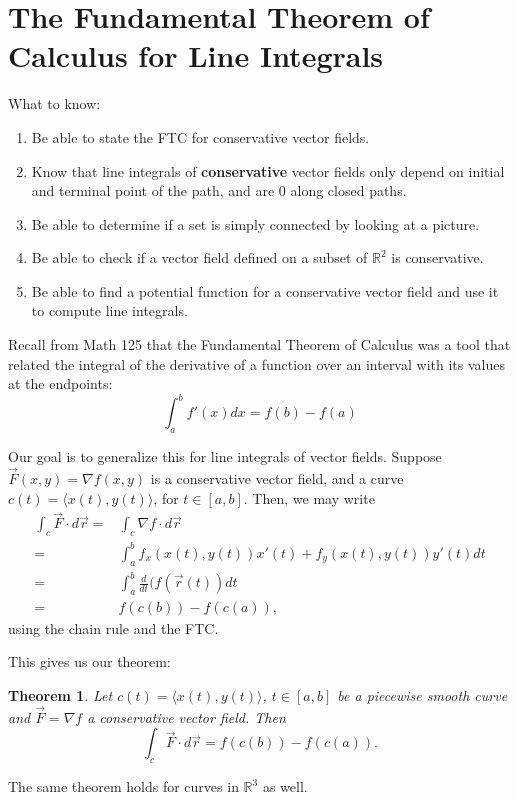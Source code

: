 \documentclass[12pt]{article}
\title{}
\newcommand{\R}{ \mathbb{R}}
\newcommand{\vr}{\vec{r}{}}
\newcommand{\vF}{\vec{F}}
\renewcommand{\lg}{\langle}
\newcommand{\rg}{\rangle}
\newtheorem{theorem}{Theorem}
\begin{document}
\section*{The Fundamental Theorem of Calculus for Line Integrals}
What to know:
\begin{enumerate}
\item Be able to state the FTC for conservative vector fields.
\item Know that line integrals of \textbf{conservative} vector fields only depend on initial and terminal point of the path, and are 0 along closed paths.
\item Be able to determine if a set is simply connected by looking at a picture.
\item Be able to check if a vector field defined on a subset of $\R^2$ is conservative.
\item Be able to find a potential function for a conservative vector field and use it to compute line integrals.
\end{enumerate}

Recall from Math 125 that the Fundamental Theorem of Calculus was a tool that related the integral of the derivative of a function over an interval with its values at the endpoints:
\begin{equation}
\int_a^b f'(x)dx=f(b)-f(a)
\end{equation}

Our goal is to generalize this for line integrals of vector fields. Suppose $\vF(x,y)=\nabla f (x,y)$ is a conservative vector field, and a curve $c(t)=\lg x(t),y(t)\rg$, for $t\in [a,b]$. Then, we may write \begin{align*}
\int_c \vF\cdot d\vr=&\int_c\nabla f\cdot d\vr\\
=&\int_a^bf_x (x(t),y(t))x'(t)+f_y(x(t),y(t))y'(t)dt\\
=&\int_a^b\frac{d}{dt}(f(\vr(t))dt\\
=&f(c(b))-f(c(a)),
\end{align*}
using the chain rule and the FTC.

This gives us our theorem:
\begin{theorem} Let $c(t)=\lg x(t),y(t)\rg$, $t\in[a,b]$ be a piecewise smooth curve and $\vF=\nabla f$ a conservative vector field. Then\begin{equation}\int_c \vF\cdot d\vr =f(c(b))-f(c(a)).\label{eq1}\end{equation}
\end{theorem} The same theorem holds for curves in $\R^3$ as well.
\end{document}
